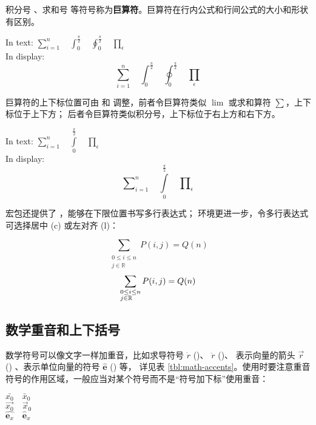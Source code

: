 积分号 、求和号  等符号称为\textbf{巨算符}。巨算符在行内公式和行间公式的大小和形状有区别。
\begin{example}
In text:
$\sum_{i=1}^n \quad
\int_0^{\frac{\pi}{2}} \quad
\oint_0^{\frac{\pi}{2}} \quad
\prod_\epsilon $ \\
In display:
\[\sum_{i=1}^n \quad
\int_0^{\frac{\pi}{2}} \quad
\oint_0^{\frac{\pi}{2}} \quad
\prod_\epsilon \]
\end{example}

巨算符的上下标位置可由  和  调整，前者令巨算符类似 $\lim$ 或求和算符 $\sum$，上下标位于上下方；
后者令巨算符类似积分号，上下标位于右上方和右下方。
\begin{example}
In text:
$\sum\limits_{i=1}^n \quad
\int\limits_0^{\frac{\pi}{2}} \quad
\prod\limits_\epsilon $ \\
In display:
\[\sum\nolimits_{i=1}^n \quad
\int\limits_0^{\frac{\pi}{2}} \quad
\prod\nolimits_\epsilon \]
\end{example}

 宏包还提供了 ，能够在下限位置书写多行表达式；
环境更进一步，令多行表达式可选择居中 (c) 或左对齐 (l)：
\begin{example}
\[
\sum_{\substack{0\le i\le n \\
  j\in \mathbb{R}}}
P(i,j) = Q(n)
\]
\[
\sum_{\begin{subarray}{l}
  0\le i\le n \\
  j\in \mathbb{R}
\end{subarray}}
P(i,j) = Q(n)
\]
\end{example}

\subsection{数学重音和上下括号}\label{subsec:math-accents}

数学符号可以像文字一样加重音，比如求导符号 $\dot{r}$ ()、 $\ddot{r}$ ()、
表示向量的箭头 $\vec{r}$ () 、表示单位向量的符号 $\hat{\mathbf{e}}$ () 等，
详见表 \ref{tbl:math-accents}。使用时要注意重音符号的作用区域，一般应当对某个符号而不是“符号加下标”使用重音：
\begin{example}
$\bar{x_0} \quad \bar{x}_0$\\[5pt]
$\vec{x_0} \quad \vec{x}_0$\\[5pt]
$\hat{\mathbf{e}_x} \quad
 \hat{\mathbf{e}}_x$
\end{example}

